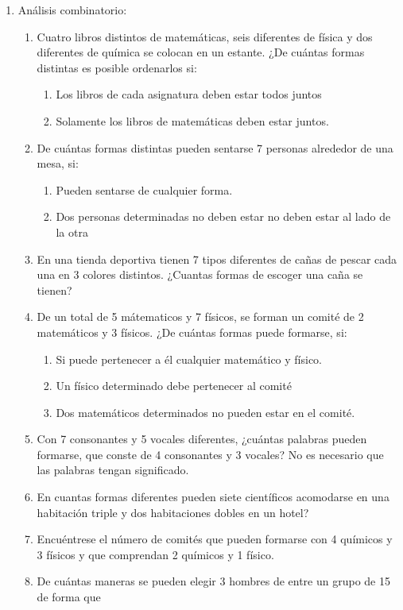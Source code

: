 \documentclass[12pt,letterpaper]{report}
\begin{document}
\begin{enumerate}
	 	\item Análisis combinatorio:
	 	\begin{enumerate}
	 		\item Cuatro libros distintos de matemáticas, seis diferentes de física y dos diferentes de química se colocan en un estante. ¿De cuántas formas distintas es posible ordenarlos si: 
	 			\begin{enumerate} 
	 				\item Los libros de cada asignatura deben estar todos juntos
	 				\item Solamente los libros de matemáticas deben estar juntos.
	 			\end{enumerate}
	 			\item De cuántas formas distintas pueden sentarse 7 personas alrededor de una mesa, si:
	 			\begin{enumerate}
	 				\item Pueden sentarse de cualquier forma.
	 				\item Dos personas determinadas no deben estar no deben estar al lado de la otra
	 			\end{enumerate}
	 			\item En una tienda deportiva tienen 7 tipos diferentes de cañas de pescar cada una en 3 colores distintos. ¿Cuantas formas de escoger una caña se tienen? 
	 			\item De un total de 5 mátematicos y 7 físicos, se forman un comité de 2 matemáticos y 3 físicos. ¿De cuántas formas puede formarse, si:
	 				\begin{enumerate}
	 					\item Si puede pertenecer a él cualquier matemático y físico.
	 					\item Un físico determinado debe pertenecer al comité
	 					\item Dos matemáticos determinados no pueden estar en el comité.
	 				\end{enumerate} 
	 			\item Con 7 consonantes y 5 vocales diferentes, ¿cuántas palabras pueden formarse, que conste de 4 consonantes y 3 vocales? No es necesario que las palabras tengan significado.	
	 			\item En cuantas formas diferentes pueden siete científicos acomodarse en una habitación triple y dos habitaciones dobles en un hotel?
	 			\item Encuéntrese el número de comités que pueden formarse con 4 químicos y 3 físicos y que comprendan 2 químicos y 1 físico.
	 			\item De cuántas maneras se pueden elegir 3 hombres de entre un grupo de 15 de forma que

\end{enumerate}
\end{enumerate}
\end{document}
